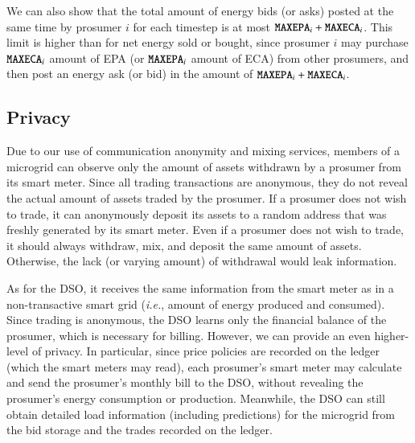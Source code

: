 We can also show that the total amount of energy bids (or asks) posted at
the same time by prosumer $i$ for each timestep is at most
$\texttt{MAXEPA}_i + \texttt{MAXECA}_i$.  This limit is higher than for
net energy sold or bought, since prosumer $i$ may purchase
$\texttt{MAXECA}_i$ amount of EPA (or $\texttt{MAXEPA}_i$ amount of ECA)
from other prosumers, and then post an energy ask (or bid) in the
amount of $\texttt{MAXEPA}_i + \texttt{MAXECA}_i$.

\subsection{Privacy}
Due to our use of communication anonymity and mixing services, members
of a microgrid can observe only the amount of assets withdrawn by a
prosumer from its smart meter.
Since all trading transactions are anonymous, they do not reveal the
actual amount of assets traded by the prosumer.  If a prosumer does
not wish to trade, it can anonymously deposit its assets to
a random address that was freshly generated by its smart meter.  Even
if a prosumer does not wish to trade, it should always
withdraw, mix, and deposit the same amount of assets.  Otherwise, the
lack (or varying amount) of withdrawal would leak information.

As for the DSO, it receives the same information from the smart meter
as in a non-transactive smart grid (\emph{i.e.}, amount of energy
produced and consumed).  Since trading is anonymous, the DSO learns
only the financial balance of the prosumer, which is necessary for
billing.  However, we can provide an even higher-level of privacy.  In
particular, since price policies are recorded on the ledger (which the
smart meters may read), each prosumer's smart meter may calculate and
send the prosumer's monthly bill to the DSO, without revealing the
prosumer's energy consumption or production.  Meanwhile, the DSO can
still obtain detailed load information (including predictions) for the
microgrid from the bid storage and the trades recorded on the ledger.

